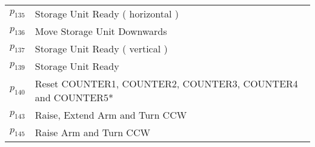 \begin{longtable}{M{5cm}M{10cm}}
\hyperlink{completeNet:p135}{\hypertarget{completeTable:p135}{$p_{135}$}} & Storage Unit Ready ( horizontal )\\
\hyperlink{completeNet:p136}{\hypertarget{completeTable:p136}{$p_{136}$}} & Move Storage Unit Downwards\\
\hyperlink{completeNet:p137}{\hypertarget{completeTable:p137}{$p_{137}$}} & Storage Unit Ready ( vertical )\\
\hyperlink{completeNet:p139}{\hypertarget{completeTable:p139}{$p_{139}$}} & Storage Unit Ready\\
\hyperlink{completeNet:p140}{\hypertarget{completeTable:p140}{$p_{140}$}} & Reset COUNTER1, COUNTER2, COUNTER3, COUNTER4 and COUNTER5*\\
\hyperlink{completeNet:p143}{\hypertarget{completeTable:p143}{$p_{143}$}} & Raise, Extend Arm and Turn CCW\\
\hyperlink{completeNet:p145}{\hypertarget{completeTable:p145}{$p_{145}$}} & Raise Arm and Turn CCW\\
\end{longtable}
